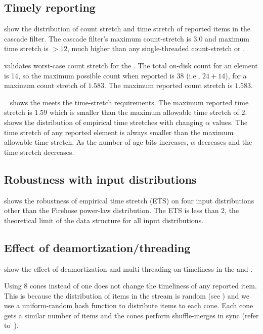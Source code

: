 \subsection{Timely reporting}
\label{timely-reporting}

  
show the distribution of count stretch and time stretch of reported items in the
cascade filter. The cascade filter's maximum count-stretch is $3.0$ and maximum time stretch is $>12$,
much higher than 
any single-threaded 
count-stretch or \ts.

\ourparagraph{\Cs}  validates worst-case count stretch
for the \cs.
The total on-disk count for an element
is 14, so the maximum possible count when reported is $38$ (i.e.,
$24+14$), for a maximum count stretch of $1.583$.  The maximum reported count
stretch is $1.583$.
%

\ourparagraph{\Ts} ~ shows the \ts meets the time-stretch requirements.
%
The maximum reported time stretch is $1.59$ which is smaller than the maximum
allowable time stretch of $2$.
%
~ shows the distribution of empirical time
stretches with changing $\alpha$ values. The time stretch of any
reported element is always smaller than the maximum allowable time stretch.  As
the number of age bits increases, $\alpha$ decreases and the time stretch decreases.

\subsection{Robustness with input distributions}

 shows the robustness of empirical time stretch (ETS) on
four input distributions other than the Firehose power-law distribution.
The ETS is less than 2, the theoretical
limit of the data structure for all input distributions.

\subsection{Effect of deamortization/threading}
\label{multi-delay}

 show the effect of
deamortization and multi-threading on timeliness in the \cs and \ts.

Using $8$ cones instead of one does not change the timeliness of any reported
item.
%
This is because the distribution of items in the stream is random (see
) and we use a uniform-random hash function to distribute items to
each cone. Each cone gets a similar number of items and the cones perform
shuffle-merges in sync (refer to~).

